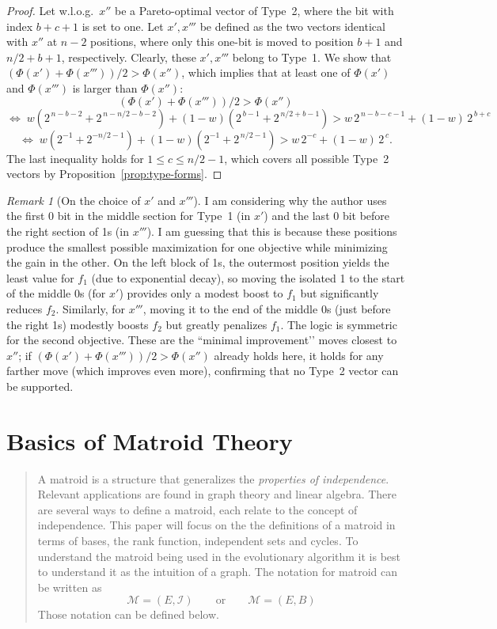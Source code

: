 \documentclass[a4paper, 11pt]{report}
\theoremstyle{remark}
\newtheorem*{remark}{Remark}
\begin{document}
\begin{proof}
Let w.l.o.g.\ $x''$ be a Pareto-optimal vector of Type~2, where the bit with index $b+c+1$ is set to one. Let $x',x'''$ be defined as the two vectors 
identical with $x''$ at $n-2$ positions, where only this one-bit is moved to position $b+1$ and $n/2+b+1$, respectively. Clearly, these $x',x'''$ belong to 
Type~1. We show that $(\Phi(x')+\Phi(x'''))/2>\Phi(x'')$, which implies that at least one of $\Phi(x')$ and $\Phi(x''')$ is larger than $\Phi(x'')$:
\[
(\Phi(x')+\Phi(x'''))/2>\Phi(x'')
\]
\[
\Leftrightarrow\;
w\!\left(2^{\,n-b-2}+2^{\,n-n/2-b-2}\right)
+(1-w)\!\left(2^{\,b-1}+2^{\,n/2+b-1}\right)
>
w\,2^{\,n-b-c-1}+(1-w)\,2^{\,b+c}
\]
\[
\Leftrightarrow\;
w\!\left(2^{-1}+2^{-n/2-1}\right)
+(1-w)\!\left(2^{-1}+2^{\,n/2-1}\right)
>
w\,2^{-c}+(1-w)\,2^{\,c}.
\]
The last inequality holds for $1\le c\le n/2-1$, which covers all possible Type~2 vectors by Proposition~\ref{prop:type-forms}. \qedhere
\end{proof}
\begin{remark}[On the choice of $x'$ and $x'''$]
    I am considering why the author uses the first 0 bit in the middle section for Type~1 (in \(x'\)) and the last 0 bit before the right section of 1s (in \(x'''\)). 
    I am guessing that this is because these positions produce the smallest possible maximization for one objective while minimizing the gain in the other. 
    On the left block of 1s, the outermost position yields the least value for \(f_1\) (due to exponential decay), so moving the isolated 1 to the start of the middle 0s 
    (for \(x'\)) provides only a modest boost to \(f_1\) but significantly reduces \(f_2\). Similarly, for \(x'''\), moving it to the end of the middle 0s (just before the 
    right 1s) modestly boosts \(f_2\) but greatly penalizes \(f_1\). The logic is symmetric for the second objective. These are the “minimal improvement’’ moves closest to \(x''\); 
    if \((\Phi(x')+\Phi(x'''))/2>\Phi(x'')\) already holds here, it holds for any farther move (which improves even more), confirming that no Type~2 vector can be supported.
\end{remark}

\section{Basics of Matroid Theory \cite{hillman_matroid_2016}}
    \begin{quote}
        A matroid is a structure that generalizes the \emph{properties of independence}. Relevant applications are found in graph theory and linear algebra. There are several ways to define a matroid, 
        each relate to the concept of independence. This paper will focus on the the definitions of a matroid in terms of bases, the rank function, independent sets and cycles.
        To understand the matroid being used in the evolutionary algorithm it is best to understand it as the intuition of a graph. The notation for 
        matroid can be written as 
        \begin{equation*}
            \mathcal{M} = (E,\mathcal{I})\qquad\text{or}\qquad\mathcal{M} = (E,B)
        \end{equation*}
        Those notation can be defined below.
    \end{quote}
\end{document}
